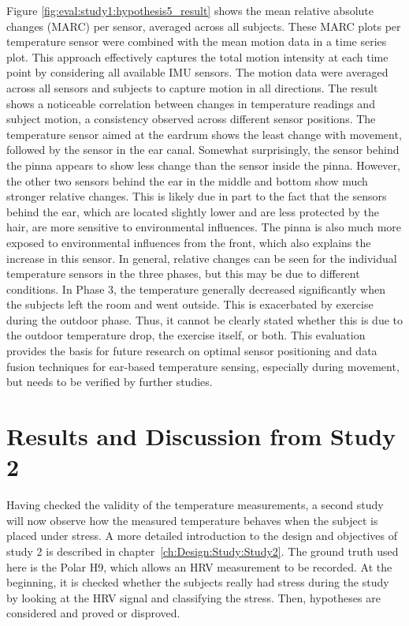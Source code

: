 Figure \ref{fig:eval:study1:hypothesis5_result} shows the mean relative absolute changes (MARC) per sensor, averaged across all subjects.
These MARC plots per temperature sensor were combined with the mean motion data in a time series plot.
This approach effectively captures the total motion intensity at each time point by considering all available IMU sensors.
The motion data were averaged across all sensors and subjects to capture motion in all directions.
The result shows a noticeable correlation between changes in temperature readings and subject motion, a consistency observed across different sensor positions.
The temperature sensor aimed at the eardrum shows the least change with movement, followed by the sensor in the ear canal.
Somewhat surprisingly, the sensor behind the pinna appears to show less change than the sensor inside the pinna. 
However, the other two sensors behind the ear in the middle and bottom show much stronger relative changes. 
This is likely due in part to the fact that the sensors behind the ear, which are located slightly lower and are less protected by the hair, are more sensitive to environmental influences. 
The pinna is also much more exposed to environmental influences from the front, which also explains the increase in this sensor.
In general, relative changes can be seen for the individual temperature sensors in the three phases, but this may be due to different conditions. 
In Phase 3, the temperature generally decreased significantly when the subjects left the room and went outside.
This is exacerbated by exercise during the outdoor phase. 
Thus, it cannot be clearly stated whether this is due to the outdoor temperature drop, the exercise itself, or both.
This evaluation provides the basis for future research on optimal sensor positioning and data fusion techniques for ear-based temperature sensing, especially during movement, but needs to be verified by further studies.

\section{Results and Discussion from Study 2}
\label{sec:Evaluation:Study2}
Having checked the validity of the temperature measurements, a second study will now observe how the measured temperature behaves when the subject is placed under stress.
A more detailed introduction to the design and objectives of study 2 is described in chapter~\ref{ch:Design:Study:Study2}.
The ground truth used here is the Polar H9, which allows an HRV measurement to be recorded.
At the beginning, it is checked whether the subjects really had stress during the study by looking at the HRV signal and classifying the stress.
Then, hypotheses are considered and proved or disproved.

